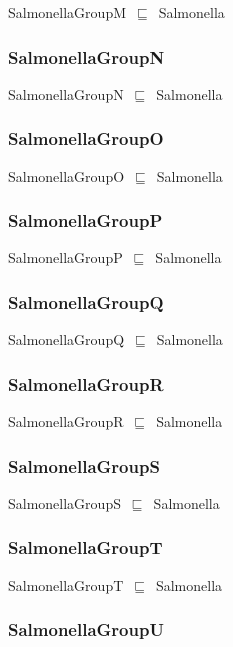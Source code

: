 \documentclass{article}
\begin{document}
SalmonellaGroupM~\ensuremath{\sqsubseteq}~Salmonella~

\subsubsection*{SalmonellaGroupN}

SalmonellaGroupN~\ensuremath{\sqsubseteq}~Salmonella~

\subsubsection*{SalmonellaGroupO}

SalmonellaGroupO~\ensuremath{\sqsubseteq}~Salmonella~

\subsubsection*{SalmonellaGroupP}

SalmonellaGroupP~\ensuremath{\sqsubseteq}~Salmonella~

\subsubsection*{SalmonellaGroupQ}

SalmonellaGroupQ~\ensuremath{\sqsubseteq}~Salmonella~

\subsubsection*{SalmonellaGroupR}

SalmonellaGroupR~\ensuremath{\sqsubseteq}~Salmonella~

\subsubsection*{SalmonellaGroupS}

SalmonellaGroupS~\ensuremath{\sqsubseteq}~Salmonella~

\subsubsection*{SalmonellaGroupT}

SalmonellaGroupT~\ensuremath{\sqsubseteq}~Salmonella~

\subsubsection*{SalmonellaGroupU}
\end{document}

